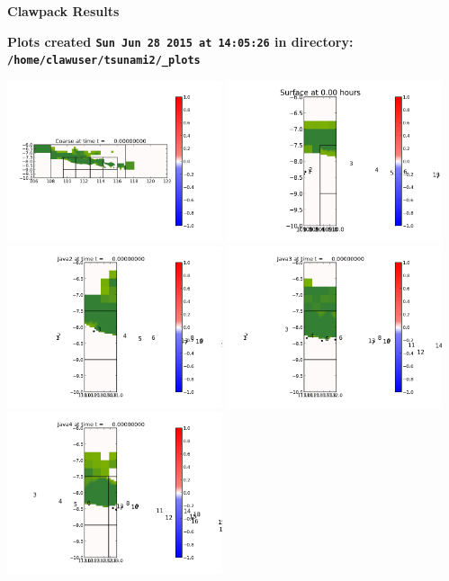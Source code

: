 \documentclass[11pt]{article}
\begin{document}
        \begin{center}{\Large\bf Clawpack Results}\vskip 5pt
        
        \bf Plots created {\tt Sun Jun 28 2015 at 14:05:26} in directory: \vskip 5pt
        \verb+/home/clawuser/tsunami2/_plots+
        \end{center}
        \vskip 5pt
        \includegraphics[width=0.475\textwidth]{frame0000fig0.png}
\includegraphics[width=0.475\textwidth]{frame0000fig15.png}
\vskip 10pt 
\includegraphics[width=0.475\textwidth]{frame0000fig25.png}
\includegraphics[width=0.475\textwidth]{frame0000fig20.png}
\vskip 10pt 
\includegraphics[width=0.475\textwidth]{frame0000fig30.png}
\end{document}
